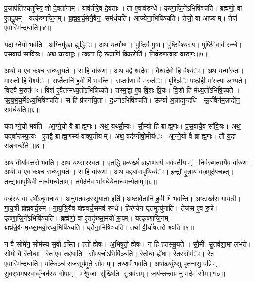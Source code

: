 प्र॒जाप॑तिश्चतुस्त्रि॒शो दे॒वता॑नाम्। याव॑तीरे॒व दे॒वताः। ता ए॒वाव॑रुन्धे। कृ॒ष्णा॒जि॒ने॑ऽभिषि॑ञ्चति। ब्रह्म॑णो॒ वा ए॒तद्रू॒पम्। यत्कृ॑ष्णाजि॒नम्। ब्र॒ह्म॒व॒र्च॒सेनै॒वैन॒ सम॑र्धयति। आज्ये॑ना॒भिषि॑ञ्चति। तेजो॒ वा आज्यम्। तेज॑ ए॒वास्मि॑न्दधाति॥४॥


यदाग्ने॒यो भव॑ति। अ॒ग्निमु॑खा॒ ह्यृद्धि॑ः। अथ॒ यत्पौ॒ष्णः। पुष्टि॒र्वै पू॒षा। पुष्टि॒र्वैश्य॑स्य। पुष्टि॑मे॒वाव॑ रुन्धे। प्र॒स॒वाय॑ सावि॒त्रः। अथ॒ यत्त्वा॒ष्ट्रः। त्वष्टा॒ हि रू॒पाणि॑ विक॒रोति॑। नि॒र्व॒रु॒ण॒त्वाय॑ वारु॒णः॥५॥

अथो॒ य ए॒व कश्च॒ सन्थ्सू॒यते। स हि वा॑रु॒णः। अथ॒ यद्वैश्वदे॒वः। वै॒श्व॒दे॒वो हि वैश्य॑ः। अथ॒ यन्मा॑रु॒तः। मा॒रु॒तो हि वैश्य॑ः। स॒प्तैतानि॑ ह॒वीषि॑ भवन्ति। स॒प्तग॑णा॒ वै म॒रुत॑ः। पृश्ञि॑ः पष्ठौ॒ही मा॑रु॒त्या ल॑भ्यते। विड्वै म॒रुत॑ः। विश॑ ए॒वैतन्म॑ध्य॒तो॑ऽभिषि॑च्यते। तस्मा॒द्वा ए॒ष वि॒शः प्रि॒यः। वि॒शो हि म॑ध्य॒तो॑ऽभिषि॒च्यते। ऋ॒ष॒भ॒च॒र्मेऽध्य॒भिषि॑ञ्चति। स हि प्र॑जनयि॒ता। द॒ध्नाऽभिषि॑ञ्चति। ऊर्ग्वा अ॒न्नाद्य॒न्दधि॑। ऊ॒र्जैवैन॑म॒न्नाद्ये॑न॒ सम॑र्धयति॥६॥


यदाग्ने॒यो भव॑ति। आ॒ग्ने॒यो वै ब्राह्म॒णः। अथ॒ यथ्सौ॒म्यः। सौ॒म्यो हि ब्राह्म॒णः। प्र॒स॒वायै॒व सा॑वि॒त्रः। अथ॒ यद्बा॑ऱ्हस्प॒त्यः। ए॒तद्वै ब्राह्म॒णस्य॑ वाक्प॒तीयम्। अथ॒ यद॑ग्नीषो॒मीय॑ः। आ॒ग्ने॒यो वै ब्राह्म॒णः। तौ य॒दा स॒ङ्गच्छे॑ते ॥७॥

अथ॑ वी॒र्या॑वत्तरो भवति। अथ॒ यथ्सा॑रस्व॒तः। ए॒तद्धि प्र॒त्यख्षं॑ ब्राह्म॒णस्य॑ वाक्प॒तीयम्। नि॒र्व॒रु॒ण॒त्वायै॒व वा॑रु॒णः। अथो॒ य ए॒व कश्च॒ सन्थ्सू॒यते। स हि वा॑रु॒णः। अथ॒ यद्द्या॑वापृथि॒व्य॑ः। इन्द्रो॑ वृ॒त्राय॒ वज्र॒मुद॑यच्छत्। तन्द्यावा॑पृथि॒वी नान्व॑मन्येताम्। तमे॒तेनै॒व भा॑ग॒धेये॒नान्व॑मन्येताम्॥८॥

वज्र॑स्य॒ वा ए॒षो॑ऽनुमा॒नाय॑। अनु॑मतवज्रस्सूयाता॒ इति॑। अ॒ष्टावे॒तानि॑ ह॒वीषि॑ भवन्ति। अ॒ष्टाख्ष॑रा गाय॒त्री। गा॒य॒त्री ब्र॑ह्मवर्च॒सम्। गा॒य॒त्रि॒यैव ब॑ह्मवर्च॒समव॑ रुन्धे। हिर॑ण्येन घृ॒तमुत्पु॑नाति। तेज॑स ए॒व रु॒चे। कृ॒ष्णा॒जि॒ने॑ऽभिषि॑ञ्चति। ब्रह्म॑णो॒ वा ए॒तदृ॑ख्सा॒मयो॑ रू॒पम्। यत्कृ॑ष्णाजि॒नम्। ब्रह्म॑न्ने॒वैन॑मृख्सा॒मयो॒रध्य॒भिषि॑ञ्चति। घृ॒तेना॒भिषि॑ञ्चति। तथा॑ वी॒र्या॑वत्तरो भवति॥९॥


न वै सोमे॑न॒ सोम॑स्य स॒वोऽस्ति। ह॒तो ह्ये॑षः। अ॒भिषु॑तो॒ ह्ये॑षः। न हि ह॒तस्सू॒यते। सौ॒मी सू॒तव॑शा॒मा ल॑भते। सोमो॒ वै रे॑तो॒धाः। रेत॑ ए॒व तद्द॑धाति। सौ॒म्यर्चाऽभिषि॑ञ्चति। रे॒तो॒धा ह्ये॑षा। रेत॒स्सोम॑ः। रेत॑ ए॒वास्मि॑न्दधाति। यत्किञ्च॑ राज॒सूय॑मृ॒ते सोमम्। तथ्सर्वं॑ भवति। अषा॑ढय्युँ॒थ्सु पृत॑नासु॒ पप्रिम्। सु॒व॒र्॒षाम॒फ्स्वाव्वृँ॒जन॑स्य गो॒पाम्। भ॒रे॒षु॒जा सु॑ख्षि॒ति सु॒श्रव॑सम्। जय॑न्त॒न्त्वामनु॑ मदेम सोम॥१०॥

